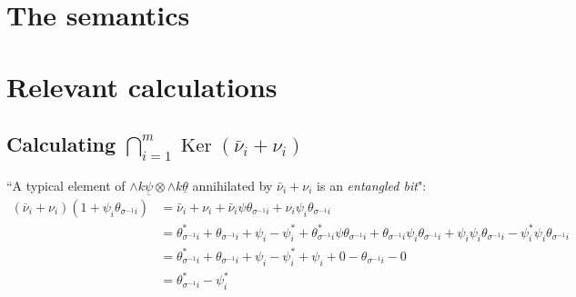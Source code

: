 \documentclass[12pt]{article}
\theoremstyle{plain}
\theoremstyle{definition}
\begin{document}
\section{The semantics}




\section{Relevant calculations}

\subsection{Calculating $\bigcap_{i = 1}^m \operatorname{Ker}(\bar{\nu}_i + \nu_i)$}
``A typical element of $\wedge k \underline{\psi} \otimes \wedge k \underline{\theta}$ annihilated by $\bar{\nu}_i + \nu_i$ is an \emph{entangled bit}":
\begin{align*}
(\overline{\nu}_i + \nu_i)(1 + \psi_i\theta_{\sigma^{-1}i}) &= \bar{\nu}_i + \nu_i + \bar{\nu}_i\psi\theta_{\sigma^{-1}i} + \nu_i\psi_i\theta_{\sigma^{-1}i}\\
&= \theta_{\sigma^{-1}i}^\ast + \theta_{\sigma^{-1}i} + \psi_i - \psi^\ast_i + \theta_{\sigma^{-1}i}^\ast \psi\theta_{\sigma^{-1}i} + \theta_{\sigma^{-1}i}\psi_i\theta_{\sigma^{-1}i} + \psi_i\psi_i\theta_{\sigma^{-1}i} - \psi^\ast_i \psi_i\theta_{\sigma^{-1}i}\\
&= \theta_{\sigma^{-1}i}^\ast + \theta_{\sigma^{-1}i} + \psi_i- \psi_i^\ast  + \psi_i + 0 - \theta_{\sigma^{-1}i} - 0\\
&= \theta_{\sigma^{-1}i}^\ast - \psi_i^\ast
\end{align*}
\end{document}
